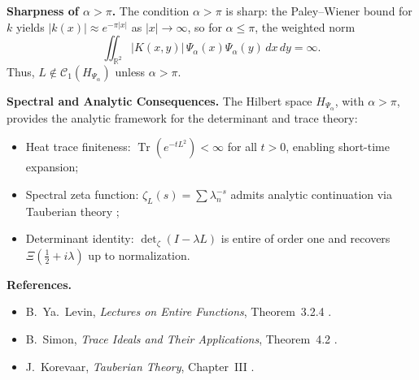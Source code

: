 \begin{definition}
\medskip
\noindent\textbf{Sharpness of \( \alpha > \pi \).}
The condition \( \alpha > \pi \) is sharp: the Paley--Wiener bound for \( k \) yields \( |k(x)| \approx e^{-\pi|x|} \) as \( |x| \to \infty \), so for \( \alpha \le \pi \), the weighted norm
\[
\iint_{\mathbb{R}^2} |K(x,y)| \, \Psi_\alpha(x)\Psi_\alpha(y)\, dx\,dy = \infty.
\]
Thus, \( L \notin \mathcal{C}_1(H_{\Psi_\alpha}) \) unless \( \alpha > \pi \).

\medskip
\noindent\textbf{Spectral and Analytic Consequences.}
The Hilbert space \( H_{\Psi_\alpha} \), with \( \alpha > \pi \), provides the analytic framework for the determinant and trace theory:
\begin{itemize}
    \item Heat trace finiteness: \( \operatorname{Tr}(e^{-tL^2}) < \infty \) for all \( t > 0 \), enabling short-time expansion;
    \item Spectral zeta function: \( \zeta_L(s) = \sum \lambda_n^{-s} \) admits analytic continuation via Tauberian theory \cite{Korevaar2004Tauberian};
    \item Determinant identity: \( \det\nolimits_\zeta(I - \lambda L) \) is entire of order one and recovers \( \Xi(\tfrac{1}{2} + i\lambda) \) up to normalization.
\end{itemize}

\medskip
\noindent\textbf{References.}
\begin{itemize}
    \item B.~Ya.~Levin, \emph{Lectures on Entire Functions}, Theorem~3.2.4 \cite{Levin1996EntireLectures}.
    \item B.~Simon, \emph{Trace Ideals and Their Applications}, Theorem~4.2 \cite{Simon2005TraceIdeals}.
    \item J.~Korevaar, \emph{Tauberian Theory}, Chapter~III \cite{Korevaar2004Tauberian}.
\end{itemize}
\end{definition}
